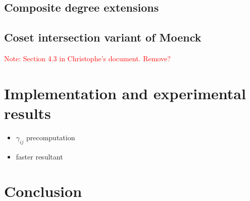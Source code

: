 \documentclass{article}
\newcommand{\Notes}[1]{\textcolor{red}{Note: #1}}
\begin{document}
\subsection{Composite degree extensions}
\label{sec:composite-degree}


\subsection{Coset intersection variant of Moenck}
\label{sec:SRAMoenck}
\Notes{Section 4.3 in Christophe's document. Remove?}



\section{Implementation and experimental results}
\label{sec:impl-exper-results}

\begin{itemize}
\item $\gamma_{ij}$ precomputation
\item faster resultant
\end{itemize}

\section{Conclusion}
\label{sec:conclusion}





\end{document}
